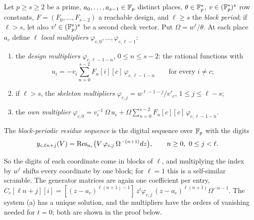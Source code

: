 \begin{definition}\label{def:block}
Let $p\ge s\ge2$ be a prime, $a_0,\dots,a_{s-1}\in\mathbb{F}_p$ distinct places, $\theta\in\mathbb{F}_p^*$, $v\in(\mathbb{F}_p^*)^s$ row constants, $F=(F_0,\dots,F_{s-2})$ a reachable design, and $\ell\ge s$ the \emph{block period}; if $\ell>s$, let also $v'\in(\mathbb{F}_p^*)^s$ be a second check vector. Put $\Omega=w^\ell/\theta$. At each place $a_c$ define $\ell$ \emph{local multipliers} $\varphi_{c,0},\dots,\varphi_{c,\ell-1}$:
\begin{enumerate}
\item[(a)] the \emph{design multipliers} $\varphi_{c,\ell-1-n}$, $0\le n\le s-2$: the rational functions with
\[
u_i=-v_i\sum_{n=0}^{s-2}F_n[i][c]\,\varphi_{c,\ell-1-n}\qquad\text{for every }i\ne c;
\]
\item[(b)] if $\ell>s$, the \emph{skeleton multipliers} $\varphi_{c,j}=w^{\ell-1-j}/v'_c$, $1\le j\le\ell-s$;
\item[(c)] the \emph{own multiplier} $\varphi_{c,0}=v_c^{-1}\,\Omega\,u_c+\Omega\sum_{n=0}^{s-2}F_n[c][c]\,\varphi_{c,\ell-1-n}$.
\end{enumerate}
The \emph{block-periodic residue sequence} is the digital sequence over $\mathbb{F}_p$ with the digits
\[
y_{c,\ell n+j}(V)=\operatorname{Res}_{a_c}\bigl(V\,\varphi_{c,j}\,\Omega^{-(n+1)}dz\bigr),\qquad n\ge0,\ 0\le j<\ell .
\]
\end{definition}

So the digits of each coordinate come in blocks of $\ell$, and multiplying the index by $w^\ell$ shifts every coordinate by one block; for $\ell=1$ this is a self-similar scramble. The generator matrices are again one coefficient per entry, $C_c[\ell n+j][i]=[(z-a_c)^{\ell(n+1)-1}]\,z^i\varphi_{c,j}\,(z-a_c)^{\ell(n+1)}\Omega^{-n-1}$. The system (a) has a unique solution, and the multipliers have the orders of vanishing needed for $t=0$; both are shown in the proof below.

